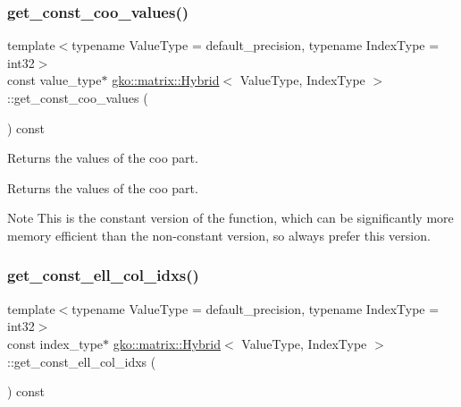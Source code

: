 \subsubsection{\texorpdfstring{get\+\_\+const\+\_\+coo\+\_\+values()}{get\_const\_coo\_values()}}
{\footnotesize\ttfamily template$<$typename Value\+Type = default\+\_\+precision, typename Index\+Type = int32$>$ \\
const value\+\_\+type$\ast$ \hyperlink{classgko_1_1matrix_1_1Hybrid}{gko\+::matrix\+::\+Hybrid}$<$ Value\+Type, Index\+Type $>$\+::get\+\_\+const\+\_\+coo\+\_\+values (\begin{DoxyParamCaption}{ }\end{DoxyParamCaption}) const\hspace{0.3cm}{\ttfamily [noexcept]}}



Returns the values of the coo part. 

\begin{DoxyReturn}{Returns}
the values of the coo part.
\end{DoxyReturn}
\begin{DoxyNote}{Note}
This is the constant version of the function, which can be significantly more memory efficient than the non-\/constant version, so always prefer this version. 
\end{DoxyNote}
\mbox{\label{classgko_1_1matrix_1_1Hybrid_a7cba3bbddd3f2f921b65bcb8cd208df5}} 
\subsubsection{\texorpdfstring{get\+\_\+const\+\_\+ell\+\_\+col\+\_\+idxs()}{get\_const\_ell\_col\_idxs()}}
{\footnotesize\ttfamily template$<$typename Value\+Type = default\+\_\+precision, typename Index\+Type = int32$>$ \\
const index\+\_\+type$\ast$ \hyperlink{classgko_1_1matrix_1_1Hybrid}{gko\+::matrix\+::\+Hybrid}$<$ Value\+Type, Index\+Type $>$\+::get\+\_\+const\+\_\+ell\+\_\+col\+\_\+idxs (\begin{DoxyParamCaption}{ }\end{DoxyParamCaption}) const\hspace{0.3cm}{\ttfamily [noexcept]}}



